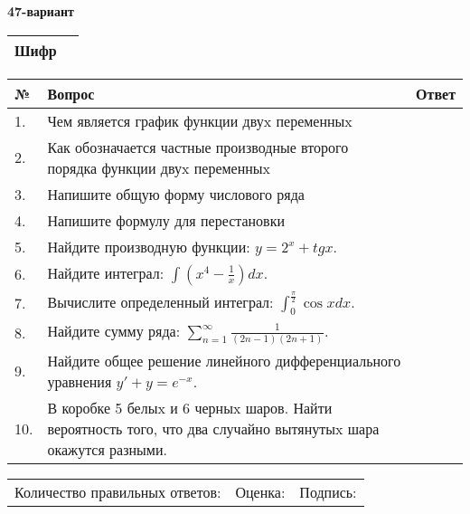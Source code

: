 \documentclass{article}
\begin{document}
  \egroup
  
  \newpage
  
  
  \textbf{47-вариант}\\
  
  \bgroup
  \def\arraystretch{1.6} %
  
  \begin{tabular}{|m{5.7cm}|m{9.5cm}|}
  \hline
  Шифр & \\
  \hline
  \end{tabular}
  
  \vspace{1cm}
  
  \begin{tabular}{|m{0.7cm}|m{10cm}|m{4cm}|}
  \hline
  № & Вопрос & Ответ \\
  \hline
  1. & Чем является график функции двуx переменныx &  \\
  \hline
  2. & Как обозначается частные производные второго порядка функции двуx переменныx &  \\
  \hline
  3. & Напишите общую форму числового ряда &  \\
  \hline
  4. & Напишите формулу для перестановки &  \\
  \hline
  5. & Найдите производную функции: \(y = 2^{x} + tgx\). &  \\
  \hline
  6. & Найдите интеграл: \(\int\left( x^{4} - \frac{1}{x} \right)dx\). &  \\
  \hline
  7. & Вычислите определенный интеграл: \(\int_{0}^{\frac{\pi}{2}}{\cos xdx}\). &  \\
  \hline
  8. & Найдите сумму ряда: \(\sum_{n = 1}^{\infty}\frac{1}{(2n - 1)(2n + 1)}\). &  \\
  \hline
  9. & Найдите общее решение линейного дифференциального уравнения \(y' + y = e^{- x}\). &  \\
  \hline
  10. & В коробке 5 белыx и 6 черныx шаров. Найти вероятность того, что два случайно вытянутыx шара окажутся разными. &  \\
  \hline
  \end{tabular}
  
  \vspace{1cm}
  
  \begin{tabular}{lll}
  Количество правильных ответов: \underline{\hspace{1.5cm}} & 
  Оценка: \underline{\hspace{1.5cm}} & 
  Подпись: \underline{\hspace{2cm}} \\
  \end{tabular}
  
\end{document}
